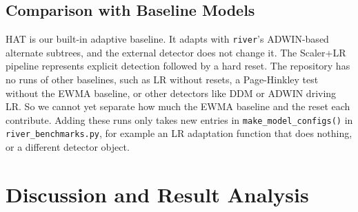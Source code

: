 \documentclass[conference]{IEEEtran}
\begin{document}
\subsection{Comparison with Baseline Models}
HAT is our built-in adaptive baseline.
It adapts with \texttt{river}'s ADWIN-based alternate subtrees, and the external detector does not change it.
The Scaler+LR pipeline represents explicit detection followed by a hard reset.
The repository has no runs of other baselines, such as LR without resets, a Page-Hinkley test without the EWMA baseline, or other detectors like DDM or ADWIN driving LR.
So we cannot yet separate how much the EWMA baseline and the reset each contribute.
Adding these runs only takes new entries in \texttt{make\_model\_configs()} in \texttt{river\_benchmarks.py}, for example an LR adaptation function that does nothing, or a different detector object.

\section{Discussion and Result Analysis}
\end{document}
